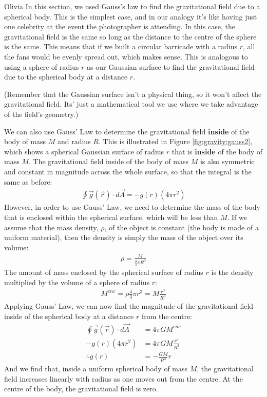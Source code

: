 \begin{studentOpinion}{Olivia}
In this section, we used Gauss's law to find the gravitational field due to a spherical body. This is the simplest case, and in our analogy it's like having just one celebrity at the event the photographer is attending. In this case, the gravitational field is the same so long as the distance to the centre of the sphere is the same. This means that if we built a circular barricade with a radius $r$, all the fans would be evenly spread out, which makes sense. This is analogous to using a sphere of radius $r$ as our Gaussian surface to find the gravitational field due to the spherical body at a distance $r$.

(Remember that the Gaussian surface isn't a physical thing, so it won't affect the gravitational field. Its' just a mathematical tool we use where we take advantage of the field's geometry.)
\end{studentOpinion}

We can also use Gauss' Law to determine the gravitational field \textbf{inside} of the body of mass $M$ and radius $R$. This is illustrated in Figure \ref{fig:gravity:gauss2}, which shows a spherical Gaussian surface of radius $r$ that is \textbf{inside} of the body of mass $M$.
The gravitational field inside of the body of mass $M$ is also symmetric and constant in magnitude across the whole surface, so that the integral is the same as before:
\begin{align*}
\oint \vec g(\vec r) \cdot d\vec A=-g(r)(4\pi r^2)
\end{align*}
However, in order to use Gauss' Law, we need to determine the mass of the body that is enclosed within the spherical surface, which will be less than $M$. If we assume that the mass density, $\rho$, of the object is constant (the body is made of a uniform material), then the density is simply the mass of the object over its volume:
\begin{align*}
\rho = \frac{M}{\frac{4}{3}\pi R^3}
\end{align*}
The amount of mass enclosed by the spherical surface of radius $r$ is the density multiplied by the volume of a sphere of radius $r$:
\begin{align*}
M^{enc} = \rho \frac{4}{3}\pi r^3 = M\frac{r^3}{R^3}
\end{align*}
Applying Gauss' Law, we can now find the magnitude of the gravitational field inside of the spherical body at a distance $r$ from the centre:
\begin{align*}
\oint \vec g(\vec r) \cdot d\vec A &= 4\pi G M^{enc}\\
-g(r)(4\pi r^2) &= 4\pi G M\frac{r^3}{R^3}\\
\therefore g(r) &= - \frac{G M}{R^3}r
\end{align*}
And we find that, inside a uniform spherical body of mass $M$, the gravitational field increases linearly with radius as one moves out from the centre. At the centre of the body, the gravitational field is zero. 

